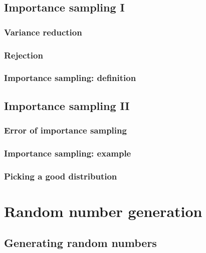\documentclass[
  letterpaper,
  DIV=11,
  numbers=noendperiod]{scrreprt}
\theoremstyle{definition}
\theoremstyle{definition}
\theoremstyle{remark}
\begin{document}
\chapter{Importance sampling I}\label{importance-sampling-i}

\section{Variance reduction}\label{variance-reduction}

\section{Rejection}\label{rejection}

\section{Importance sampling:
definition}\label{importance-sampling-definition}

\chapter{Importance sampling II}\label{importance-sampling-ii}

\section{Error of importance
sampling}\label{error-of-importance-sampling}

\section{Importance sampling:
example}\label{importance-sampling-example}

\section{Picking a good distribution}\label{picking-a-good-distribution}

\part{Random number generation}

\chapter{Generating random numbers}\label{generating-random-numbers}
\end{document}
